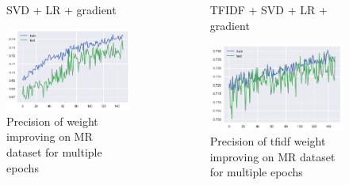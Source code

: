 \documentclass[xcolor={table}]{beamer}
\begin{document}
\begin{frame}{}
	\begin{columns}
   				\begin{figure}[H]
        			\centering
        			\caption*{SVD + LR + gradient}
        			\includegraphics[height=0.4\textheight]{images/MRDataset_grad.png}
        			\caption{Precision of weight improving on MR dataset for multiple epochs}
        		\end{figure}

        		\begin{figure}[H]
        			\centering
        			\caption*{TFIDF + SVD + LR + gradient}
        			\includegraphics[height=0.4\textheight]{images/MRDataset_tfidf_grad.png}
        			\caption{Precision of tfidf weight improving on MR dataset for multiple epochs}
        		\end{figure}
	\end{columns}        		
\end{frame} 
\end{document}
